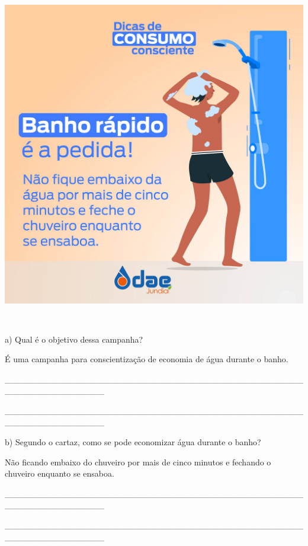 \begin{itemize}
{{{\begin{itemize}
\begin{itemize}
\includegraphics[width=5.90556in,height=5.90556in]{media/image16.jpeg}

a) Qual é o objetivo dessa campanha?

É uma campanha para conscientização de economia de água durante o banho.

\protect\hypertarget{_Hlk127709586}{}{}\_\_\_\_\_\_\_\_\_\_\_\_\_\_\_\_\_\_\_\_\_\_\_\_\_\_\_\_\_\_\_\_\_\_\_\_\_\_\_\_\_\_\_\_\_\_\_\_\_\_\_\_\_\_\_\_\_\_\_\_\_\_\_\_

\_\_\_\_\_\_\_\_\_\_\_\_\_\_\_\_\_\_\_\_\_\_\_\_\_\_\_\_\_\_\_\_\_\_\_\_\_\_\_\_\_\_\_\_\_\_\_\_\_\_\_\_\_\_\_\_\_\_\_\_\_\_\_\_

b) Segundo o cartaz, como se pode economizar água durante o banho?

Não ficando embaixo do chuveiro por mais de cinco minutos e fechando o
chuveiro enquanto se ensaboa.

\_\_\_\_\_\_\_\_\_\_\_\_\_\_\_\_\_\_\_\_\_\_\_\_\_\_\_\_\_\_\_\_\_\_\_\_\_\_\_\_\_\_\_\_\_\_\_\_\_\_\_\_\_\_\_\_\_\_\_\_\_\_\_\_

\_\_\_\_\_\_\_\_\_\_\_\_\_\_\_\_\_\_\_\_\_\_\_\_\_\_\_\_\_\_\_\_\_\_\_\_\_\_\_\_\_\_\_\_\_\_\_\_\_\_\_\_\_\_\_\_\_\_\_\_\_\_\_\_


\end{itemize}
\end{itemize}}}}
\end{itemize}
